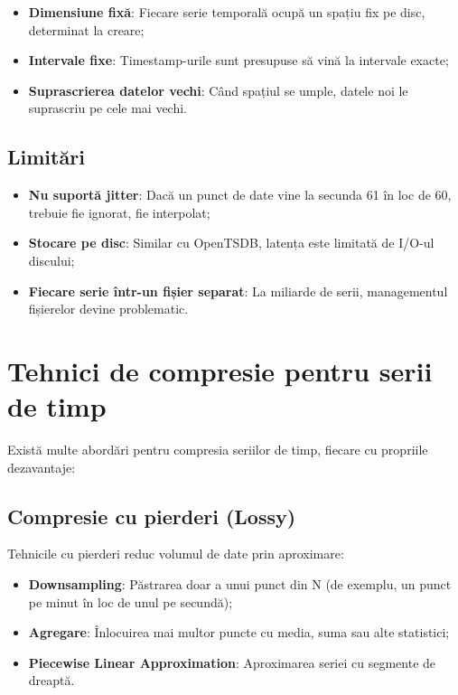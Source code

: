 \begin{itemize}
    \item \textbf{Dimensiune fixă}: Fiecare serie temporală ocupă un spațiu fix pe disc, determinat la creare;
    \item \textbf{Intervale fixe}: Timestamp-urile sunt presupuse să vină la intervale exacte;
    \item \textbf{Suprascrierea datelor vechi}: Când spațiul se umple, datele noi le suprascriu pe cele mai vechi.
\end{itemize}

\subsection{Limitări}

\begin{itemize}
    \item \textbf{Nu suportă jitter}: Dacă un punct de date vine la secunda 61 în loc de 60, trebuie fie ignorat, fie interpolat;
    \item \textbf{Stocare pe disc}: Similar cu OpenTSDB, latența este limitată de I/O-ul discului;
    \item \textbf{Fiecare serie într-un fișier separat}: La miliarde de serii, managementul fișierelor devine problematic.
\end{itemize}

\section{Tehnici de compresie pentru serii de timp}

Există multe abordări pentru compresia seriilor de timp, fiecare cu propriile dezavantaje:

\subsection{Compresie cu pierderi (Lossy)}

Tehnicile cu pierderi reduc volumul de date prin aproximare:

\begin{itemize}
    \item \textbf{Downsampling}: Păstrarea doar a unui punct din N (de exemplu, un punct pe minut în loc de unul pe secundă);
    \item \textbf{Agregare}: Înlocuirea mai multor puncte cu media, suma sau alte statistici;
    \item \textbf{Piecewise Linear Approximation}: Aproximarea seriei cu segmente de dreaptă.
\end{itemize}

